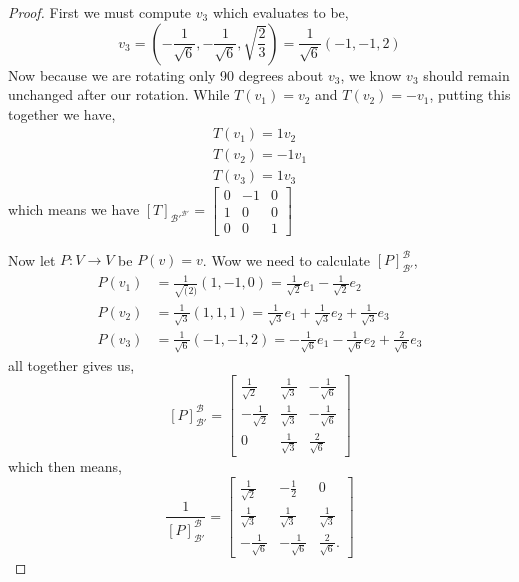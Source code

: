 \documentclass[11pt]{article}
\begin{document}
\begin{proof}
  First we must compute $v_3$ which evaluates to be,
  \[v_3 = (-\frac{1}{\sqrt{6}}, -\frac{1}{\sqrt{6}}, \sqrt{\frac{2}{3}}) = \frac{1}{\sqrt{6}}(-1,-1,2)\]
  Now because we are rotating only 90 degrees about $v_3$, we know $v_3$ should remain unchanged after our rotation. While $T(v_1) = v_2$ and $T(v_2) = -v_1$, putting this together we have,
  \begin{align*}
    T(v_1) = 1v_2 \\
    T(v_2) = -1v_1 \\
    T(v_3) = 1v_3
  \end{align*}
  which means we have $[T]_{\mathcal{B}'^{\mathcal{B}'}} = \begin{bmatrix}
    0 & -1 & 0 \\
    1 & 0 & 0 \\
    0 & 0 & 1
  \end{bmatrix}$

  Now let $P:V \to V$ be $P(v) = v$. Wow we need to calculate $[P]_{\mathcal{B}'}^{\mathcal{B}}$, 
  \begin{align*}
    P(v_1) &= \frac{1}{\sqrt(2)}(1,-1,0) = \frac{1}{\sqrt{2}}e_1 -\frac{1}{\sqrt{2}}e_2  \\
    P(v_2) &= \frac{1}{\sqrt{3}}(1,1,1) = \frac{1}{\sqrt{3}}e_1 + \frac{1}{\sqrt{3}}e_2 + \frac{1}{\sqrt{3}}e_3 \\
    P(v_3) &= \frac{1}{\sqrt{6}}(-1,-1,2) = -\frac{1}{\sqrt{6}}e_1 -\frac{1}{\sqrt{6}}e_2 + \frac{2}{\sqrt{6}}e_3 
  \end{align*}
  all together gives us,
  \[[P]_{\mathcal{B}'}^{\mathcal{B}} = \begin{bmatrix}
    \frac{1}{\sqrt{2}} & \frac{1}{\sqrt{3}} & -\frac{1}{\sqrt{6}} \\
    - \frac{1}{\sqrt{2}} & \frac{1}{\sqrt{3}} & -\frac{1}{\sqrt{6}} \\
    0 & \frac{1}{\sqrt{3}} & \frac{2}{\sqrt{6}}
  \end{bmatrix}\]
  which then means,
  \[\frac{1}{[P]_{\mathcal{B}'}^{\mathcal{B}}}= \begin{bmatrix}
    \frac{1}{\sqrt{2}} & -\frac{1}{2} & 0 \\
    \frac{1}{\sqrt{3}} & \frac{1}{\sqrt{3}} & \frac{1}{\sqrt{3}} \\
    -\frac{1}{\sqrt{6}} & -\frac{1}{\sqrt{6}} & \frac{2}{\sqrt{6}}.
  \end{bmatrix}\]


\end{proof}
\end{document}
